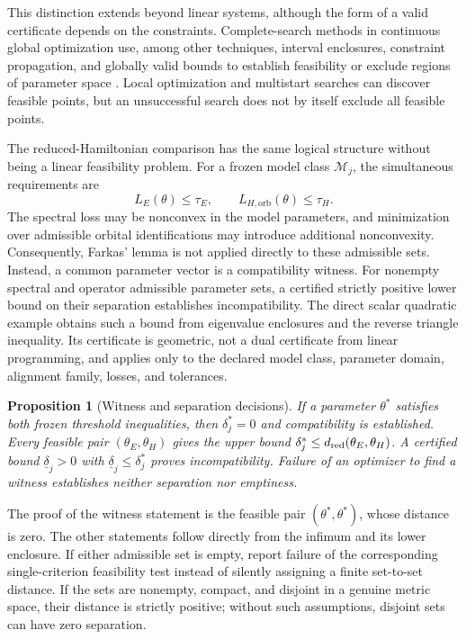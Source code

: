 \documentclass[11pt]{article}
\newcommand{\M}{\mathcal M}\newcommand{\A}{\mathcal A}\newcommand{\U}{\mathcal U}\newcommand{\HH}{\mathcal H}\newcommand{\SH}{\mathcal S_H}\newcommand{\Tr}{\operatorname{tr}}\newcommand{\dist}{\operatorname{dist}}\newcommand{\dd}{\mathrm d}
\newtheorem{proposition}{Proposition}\newtheorem{remark}{Remark}
\begin{document}
This distinction extends beyond linear systems, although the form of a valid
certificate depends on the constraints. Complete-search methods in continuous
global optimization use, among other techniques, interval enclosures,
constraint propagation, and globally valid bounds to establish feasibility or
exclude regions of parameter space \cite{neumaier2004,moore2009}. Local
optimization and multistart searches can discover feasible points, but an
unsuccessful search does not by itself exclude all feasible points.

The reduced-Hamiltonian comparison has the same logical structure without
being a linear feasibility problem. For a frozen model class $\M_j$, the
simultaneous requirements are
\begin{equation}
  L_E(\theta)\leq\tau_E,
  \qquad
  L_{H,\mathrm{orb}}(\theta)\leq\tau_H.
  \label{eq:joint-hamiltonian-feasibility}
\end{equation}
The spectral loss may be nonconvex in the model parameters, and minimization
over admissible orbital identifications may introduce additional nonconvexity.
Consequently, Farkas' lemma is not applied directly to these admissible sets.
Instead, a common parameter vector is a compatibility witness. For nonempty
spectral and operator admissible parameter sets, a certified strictly positive
lower bound on their separation establishes incompatibility. The direct scalar
quadratic example obtains such a bound from eigenvalue enclosures and the
reverse triangle inequality. Its certificate is geometric, not a dual
certificate from linear programming, and applies only to the declared model
class, parameter domain, alignment family, losses, and tolerances.

\begin{proposition}[Witness and separation decisions]\label{prop:decision}
If a parameter $\theta^*$ satisfies both frozen threshold inequalities, then $\delta_j^*=0$ and compatibility is established. Every feasible pair $(\theta_E,\theta_H)$ gives the upper bound $\delta_j^*\le d_{\rm red}(\theta_E,\theta_H)$. A certified bound $\underline\delta_j>0$ with $\underline\delta_j\le\delta_j^*$ proves incompatibility. Failure of an optimizer to find a witness establishes neither separation nor emptiness.
\end{proposition}
\noindent The proof of the witness statement is the feasible pair $(\theta^*,\theta^*)$, whose distance is zero. The other statements follow directly from the infimum and its lower enclosure. If either admissible set is empty, report failure of the corresponding single-criterion feasibility test instead of silently assigning a finite set-to-set distance. If the sets are nonempty, compact, and disjoint in a genuine metric space, their distance is strictly positive; without such assumptions, disjoint sets can have zero separation.
\end{document}
